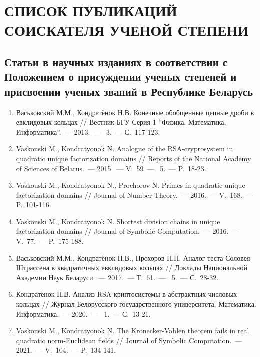 \documentclass[_00_autoref.tex]{subfiles}
\begin{document}
\chapter*{\MakeUppercase{Список публикаций соискателя ученой степени}}

\renewcommand{\labelenumi}{\arabic{enumi}.}
\renewcommand{\theenumi}{\arabic{enumi}}


\vspace{-4ex}
\section*{\fontsize{14}{15}\selectfont Статьи в научных изданиях в соответствии с Положением о присуждении ученых степеней и присвоении ученых званий в Республике Беларусь}
\vspace{-4ex}

\begin{enumerate}

    \item \label{source:Vestnik_BSU_2013}
    Васьковский М.М., Кондратёнок Н.В. Конечные обобщенные цепные дроби в евклидовых кольцах // Вестник БГУ Серия 1 ''Физика, Математика, Информатика''.~--- 2013.~--- \textnumero~3.~--- С.~117-123.

    \item \label{source:NANB_2015}
    Vaskouski M., Kondratyonok N. Analogue of the RSA-cryprosystem in quadratic unique factorization domains // Reports of the National Academy of Sciences of Belarus.~--- 2015.~--- V.~59~--- \textnumero~5.~--- P.~18-23.

    \item \label{source:JNT_2016}
    Vaskouski M., Kondratyonok N., Prochorov N. Primes in quadratic unique factorization domains // Journal of Number Theory.~--- 2016.~--- V.~168.~--- P.~101-116.

    \item \label{source:JSC_2016}
    Vaskouski M., Kondratyonok N. Shortest division chains in unique factorization domains // Journal of Symbolic Computation.~--- 2016.~--- V.~77.~--- P.~175-188.

    \item \label{source:NANB_2017}
    Васьковский М.М., Кондратёнок Н.В., Прохоров Н.П. Аналог теста Соловея-Штрассена в квадратичных евклидовых кольцах // Доклады Национальной Академии Наук Беларуси.~--- 2017.~--- Т.~61.~--- \textnumero~5.~--- С.~28-32.

    \item \label{source:BSU_Journal_2020}
    Кондратёнок Н.В. Анализ RSA-криптосистемы в абстрактных числовых кольцах // Журнал Белорусского государственного университета. Математика. Информатика.~--- 2020.~--- \textnumero~1.~--- С.~13-21.

    \item \label{source:JSC_2021}
    Vaskouski M., Kondratyonok N. The Kronecker-Vahlen theorem fails in real quadratic norm-Euclidean fields // Journal of Symbolic Computation.~--- 2021.~--- V.~104.~--- P.~134-141.
\end{enumerate}
\end{document}
